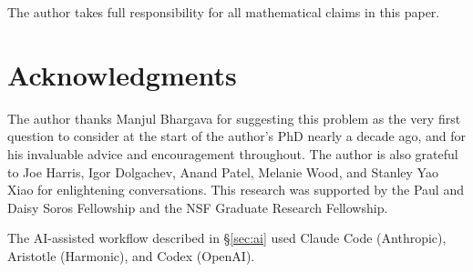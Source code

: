 \documentclass[10pt]{amsart}
\theoremstyle{definition}
\theoremstyle{remark}
\begin{document}
The author takes full responsibility for all mathematical claims in
this paper.

\section*{Acknowledgments}

\noindent The author thanks Manjul Bhargava for suggesting this problem as the very
first question to consider at the start of the author's PhD nearly a decade ago, and for his
invaluable advice and encouragement throughout.  The author is also grateful to Joe
Harris, Igor Dolgachev, Anand Patel, Melanie Wood, and Stanley Yao Xiao for
enlightening conversations.  This research was supported by the Paul and
Daisy Soros Fellowship and the NSF Graduate Research Fellowship.

The AI-assisted workflow described in \S\ref{sec:ai} used Claude Code
(Anthropic), Aristotle \cite{Aristotle2025} (Harmonic), and Codex (OpenAI).



\end{document}
